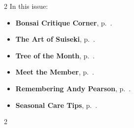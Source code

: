 \setlength{\columnsep}{-5.0cm}
\begin{multicols}{2}
    \noindent\textsf{In this issue:}
    \begin{itemize}
        \item \textsf{\textbf{Bonsai Critique Corner}}, p.~\pageref{2024-12-critique}.
        \item \textsf{\textbf{The Art of Suiseki}}, p.~\pageref{2024-12-suiseki}.
        \item \textsf{\textbf{Tree of the Month}}, p.~\pageref{2024-12-contest}.
        \item \textsf{\textbf{Meet the Member}}, p.~\pageref{2024-12-roots}.
        \item \textsf{\textbf{Remembering Andy Pearson}}, p.~\pageref{2024-12-pearson}.
        \item \textsf{\textbf{Seasonal Care Tips}}, p.~\pageref{2024-12-care}.
    \end{itemize}
    \vfill\null
    \columnbreak

    
\end{multicols}
\pagebreak

\setlength{\columnsep}{0.5cm}
\begin{multicols}{2}
    
    
    
    
    
%    
    
\end{multicols}
